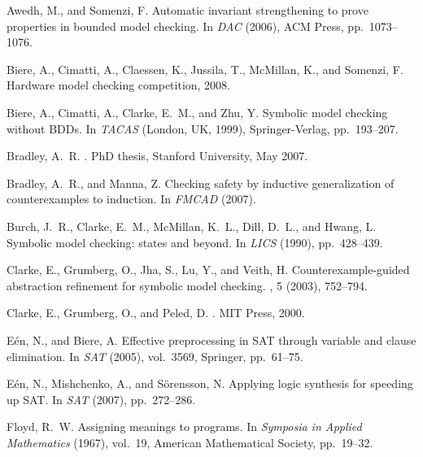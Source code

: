 \documentclass{llncs}
\begin{document}

\begin{thebibliography}{10}

{\sc Awedh, M., and Somenzi, F.}
\newblock Automatic invariant strengthening to prove properties in bounded
  model checking.
\newblock In {\em DAC\/} (2006), ACM Press, pp.~1073--1076.

{\sc Biere, A., Cimatti, A., Claessen, K., Jussila, T., McMillan, K., and
  Somenzi, F.}
\newblock Hardware model checking competition, 2008.

{\sc Biere, A., Cimatti, A., Clarke, E.~M., and Zhu, Y.}
\newblock Symbolic model checking without {BDD}s.
\newblock In {\em TACAS\/} (London, UK, 1999), Springer-Verlag, pp.~193--207.

{\sc Bradley, A.~R.}
.
\newblock PhD thesis, Stanford University, May 2007.

{\sc Bradley, A.~R., and Manna, Z.}
\newblock Checking safety by inductive generalization of counterexamples to
  induction.
\newblock In {\em FMCAD\/} (2007).

{\sc Burch, J.~R., Clarke, E.~M., McMillan, K.~L., Dill, D.~L., and Hwang, L.}
\newblock Symbolic model checking:  states and beyond.
\newblock In {\em LICS\/} (1990), pp.~428--439.

{\sc Clarke, E., Grumberg, O., Jha, S., Lu, Y., and Veith, H.}
\newblock Counterexample-guided abstraction refinement for symbolic model
  checking.
, 5 (2003), 752--794.

{\sc Clarke, E., Grumberg, O., and Peled, D.}
.
\newblock MIT Press, 2000.

{\sc E{\'e}n, N., and Biere, A.}
\newblock Effective preprocessing in {SAT} through variable and clause
  elimination.
\newblock In {\em SAT\/} (2005), vol.~3569, Springer, pp.~61--75.

{\sc E{\'e}n, N., Mishchenko, A., and S{\"o}rensson, N.}
\newblock Applying logic synthesis for speeding up {SAT}.
\newblock In {\em SAT\/} (2007), pp.~272--286.

{\sc Floyd, R.~W.}
\newblock Assigning meanings to programs.
\newblock In {\em Symposia in Applied Mathematics\/} (1967), vol.~19, American
  Mathematical Society, pp.~19--32.


\end{thebibliography}
\end{document}
